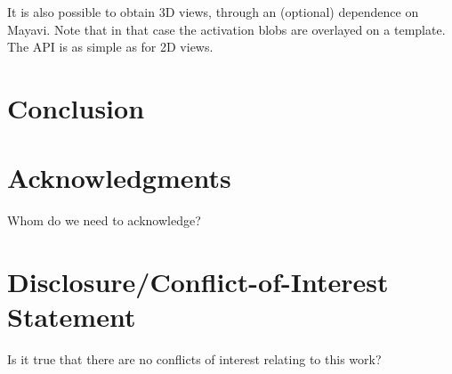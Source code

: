 \documentclass{bioinfo}
\begin{document}
It is also possible to obtain 3D views, through an (optional)
dependence on Mayavi. Note that in that case the activation blobs are
overlayed on a template.
%
The API is as simple as for 2D views.


\section{Conclusion}


\section*{Acknowledgments}
Whom do we need to acknowledge?

\section*{Disclosure/Conflict-of-Interest Statement}
Is it true that there are no conflicts of interest relating to this
work?
\end{document}
